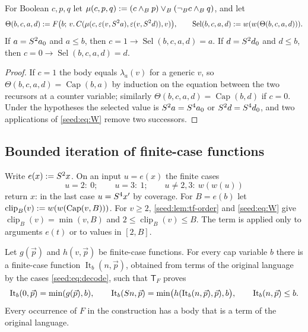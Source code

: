 \begin{lemma}\label{seed:lem:tf-sel}
For Boolean $c,p,q$ let
$\mu(c,p,q)\mathrel{:=}(c\land_Bp)\lor_B(\neg_Bc\land_Bq)$, and let
\[
 \Theta(b,c,a,d)\mathrel{:=} F\bigl(b;\,v.\,
 C(\mu(c,\varepsilon(v,S^2a),\varepsilon(v,S^2d)),v)\bigr),\qquad
 \operatorname{Sel}(b,c,a,d)\mathrel{:=} w(w(\Theta(b,c,a,d))).
\]
If $a=S^2a_0$ and $a\leq b$, then $c=1\to\operatorname{Sel}(b,c,a,d)=a$.
If $d=S^2d_0$ and $d\leq b$, then $c=0\to\operatorname{Sel}(b,c,a,d)=d$.
\end{lemma}

\begin{proof}
If $c=1$ the body equals $\lambda_a(v)$ for a generic $v$, so
$\Theta(b,c,a,d)=\operatorname{Cap}(b,a)$ by induction on the equation
between the two recursors at a counter variable; similarly
$\Theta(b,c,a,d)=\operatorname{Cap}(b,d)$ if $c=0$. Under the hypotheses
the selected value is $S^2a=S^4a_0$ or $S^2d=S^4d_0$, and two
applications of \eqref{seed:eq:W} remove two successors.
\end{proof}

\subsection{Bounded iteration of finite-case functions}

Write $e(x)\mathrel{:=}S^2x$. On an input $u=e(x)$ the finite cases
\begin{equation}\label{seed:eq:decode}
 u=2:\ 0;\qquad u=3:\ 1;\qquad u\neq2,3:\ w(w(u))
\end{equation}
return $x$: in the last case $u=S^4x'$ by coverage. For $B=e(b)$ let
$\operatorname{clip}_B(v)\mathrel{:=} w(w(\operatorname{Cap}(v,B)))$. For
$v\geq2$, \cref{seed:lem:tf-order} and \eqref{seed:eq:W} give
$\operatorname{clip}_B(v)=\min(v,B)$ and
$2\leq\operatorname{clip}_B(v)\leq B$. The term is applied only to
arguments $e(t)$ or to values in $[2,B]$.

\begin{proposition}\label{seed:prop:tf-iter}
Let $g(\vec p)$ and $h(v,\vec p)$ be finite-case functions. For every cap
variable $b$ there is a finite-case function
$\operatorname{It}_b(n,\vec p)$, obtained from terms of the original
language by the cases \eqref{seed:eq:decode}, such that $\mathsf{T}_F$
proves
\[
 \operatorname{It}_b(0,\vec p)=\min(g(\vec p),b),\qquad
 \operatorname{It}_b(S n,\vec p)
 =\min\bigl(h(\operatorname{It}_b(n,\vec p),\vec p),b\bigr),\qquad
 \operatorname{It}_b(n,\vec p)\leq b .
\]
Every occurrence of $F$ in the construction has a body that is a term of the
original language.
\end{proposition}

